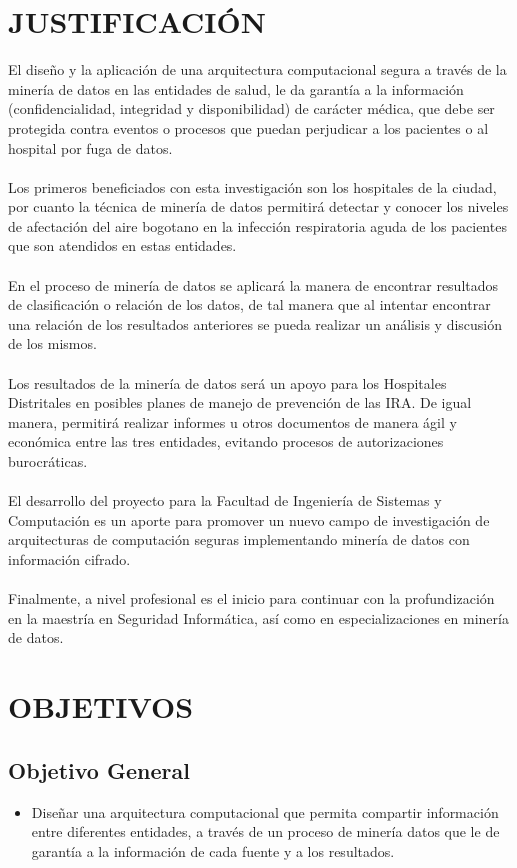 \documentclass[a4paper,openright,12pt]{book}
\theoremstyle{definition}
\theoremstyle{remark}
\begin{document}
\section{JUSTIFICACIÓN}
El diseño y la aplicación de una arquitectura computacional segura a través de la minería de datos en las entidades de salud, le da garantía a la información (confidencialidad, integridad y disponibilidad) de carácter médica, que debe ser protegida contra eventos o procesos que puedan perjudicar a los pacientes o al hospital por fuga de datos.\\\\
Los primeros beneficiados con esta investigación son los hospitales de la ciudad, por cuanto la técnica de minería de datos permitirá detectar y conocer los niveles de afectación del aire bogotano en la infección respiratoria aguda de los pacientes que son atendidos en estas entidades.\\\\En el proceso de minería de datos se aplicará la manera de encontrar resultados de clasificación o relación de los datos, de tal manera que al intentar encontrar una relación de los resultados anteriores se pueda realizar un análisis y discusión de los mismos.\\\\
Los resultados de la minería de datos será un apoyo para los Hospitales Distritales en posibles planes de manejo de prevención de las IRA. De igual manera, permitirá realizar informes u otros documentos de manera ágil y económica entre las tres entidades, evitando procesos de autorizaciones burocráticas.\\\\
El desarrollo del proyecto para la Facultad de Ingeniería de Sistemas y Computación es un aporte para promover un nuevo campo de investigación de arquitecturas de computación seguras implementando minería de datos con información cifrado.\\\\
Finalmente, a nivel profesional es el inicio para continuar con la profundización en la maestría en Seguridad Informática, así como en especializaciones en minería de datos.
\clearpage

\section{OBJETIVOS}

\subsection{Objetivo General}
\begin{itemize}
\item Diseñar una arquitectura computacional que permita compartir información entre diferentes entidades, a través de un proceso de minería datos que le de garantía a la información de cada fuente y a los resultados. 
\end{itemize}
\end{document}
